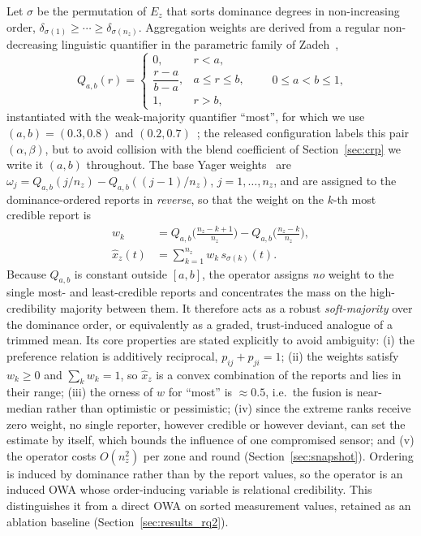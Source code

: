 \documentclass[smartcities,article,submit,moreauthors]{Definitions/mdpi}
\begin{document}
Let $\sigma$ be the permutation of $E_z$ that sorts dominance degrees
in non-increasing order, $\delta_{\sigma(1)}\geq\cdots\geq
\delta_{\sigma(n_z)}$. Aggregation weights are derived from a regular
non-decreasing linguistic quantifier in the parametric family of
Zadeh~\cite{zadeh1983},
\begin{equation}
Q_{a,b}(r)=
\begin{cases}
0, & r<a,\\[2pt]
\dfrac{r-a}{b-a}, & a\leq r\leq b,\\[6pt]
1, & r>b,
\end{cases}
\qquad 0\le a<b\le 1,
\label{eq:quantifier}
\end{equation}
instantiated with the weak-majority quantifier ``most'', for which we use
$(a,b)=(0.3,0.8)$ and $(0.2,0.7)$~\cite{herrera1996,herreraviedma2002}; the
released configuration labels this pair $(\alpha,\beta)$, but to avoid
collision with the blend coefficient of Section~\ref{sec:crp} we write it
$(a,b)$ throughout. The base Yager weights~\cite{yager1988} are
$\omega_j=Q_{a,b}(j/n_z)-Q_{a,b}((j-1)/n_z)$, $j=1,\dots,n_z$, and are
assigned to the dominance-ordered reports in \emph{reverse}, so that the
weight on the $k$-th most credible report is
\begin{equation}
\begin{aligned}
w_k&=Q_{a,b}\!\Big(\tfrac{n_z-k+1}{n_z}\Big)-Q_{a,b}\!\Big(\tfrac{n_z-k}{n_z}\Big),\\[2pt]
\hat{x}_z(t)&=\sum_{k=1}^{n_z} w_k\, s_{\sigma(k)}(t).
\end{aligned}
\label{eq:estimate}
\end{equation}
Because $Q_{a,b}$ is constant outside $[a,b]$, the operator assigns
\emph{no} weight to the single most- and least-credible reports and
concentrates the mass on the high-credibility majority between them. It
therefore acts as a robust \emph{soft-majority} over the dominance order,
or equivalently as a graded, trust-induced analogue of a trimmed mean.
Its core properties are stated explicitly to avoid ambiguity: (i) the
preference relation is additively reciprocal, $p_{ij}+p_{ji}=1$; (ii) the
weights satisfy $w_k\ge 0$ and $\sum_k w_k=1$, so $\hat{x}_z$ is a convex
combination of the reports and lies in their range; (iii) the orness of
$w$ for ``most'' is $\approx 0.5$, i.e.\ the fusion is near-median rather
than optimistic or pessimistic; (iv) since the extreme ranks receive zero
weight, no single reporter, however credible or however deviant, can set
the estimate by itself, which bounds the influence of one compromised
sensor; and (v) the operator costs $O(n_z^2)$ per zone and round
(Section~\ref{sec:snapshot}). Ordering is induced by dominance rather
than by the report values, so the operator is an induced OWA whose
order-inducing variable is relational credibility. This distinguishes it
from a direct OWA on sorted measurement values, retained as an ablation
baseline (Section~\ref{sec:results_rq2}).
\end{document}
